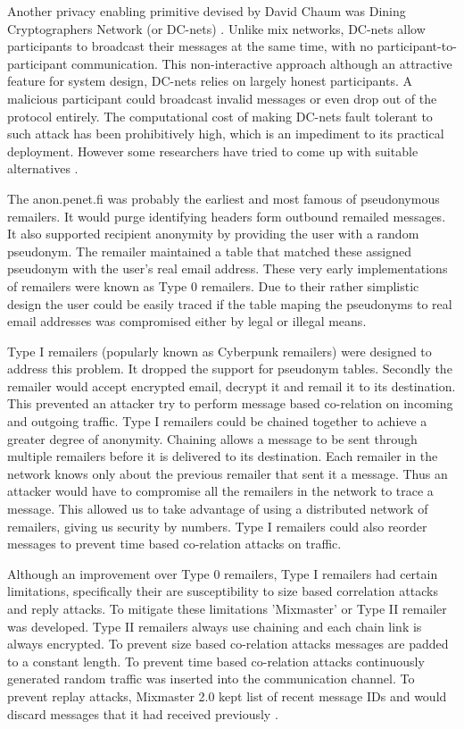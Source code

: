 \documentclass{llncs}
\begin{document}
Another privacy enabling primitive devised by David Chaum was Dining Cryptographers Network (or DC-nets) \cite{chaum-dc}. Unlike mix networks, DC-nets allow participants to broadcast their messages at the same time, with no participant-to-participant communication. This non-interactive approach although an attractive feature for system design, DC-nets relies on largely honest participants. A malicious participant could broadcast invalid messages or even drop out of the protocol entirely. The computational cost of making DC-nets fault tolerant to such attack has been prohibitively high, which is an impediment to its practical deployment. However some researchers have tried to come up with suitable alternatives \cite{golle:eurocrypt2004}.

The anon.penet.fi was probably the earliest and most famous of pseudonymous remailers. It would purge identifying headers form outbound remailed messages. It also supported recipient anonymity by providing the user with a random pseudonym. The remailer maintained a table that matched these assigned pseudonym with the user's real email address. These very early implementations of remailers were known as Type 0 remailers. Due to their rather simplistic design the user could be easily traced if the table maping the pseudonyms to real email addresses was compromised either by legal or illegal means.

Type I remailers (popularly known as Cyberpunk remailers) were designed to address this problem. It dropped the support for pseudonym tables. Secondly the remailer would accept encrypted email, decrypt it and remail it to its destination. This prevented an attacker try to perform message based co-relation on incoming and outgoing traffic. Type I remailers could be chained together to achieve a greater degree of anonymity. Chaining allows a message to be sent through multiple remailers before it is delivered to its destination. Each remailer in the network knows only about the previous remailer that sent it a message. Thus an attacker would have to compromise all the remailers in the network to trace a message. This allowed us to take advantage of using a distributed network of remailers, giving us security by numbers. Type I remailers could also reorder messages to prevent time based co-relation attacks on traffic.

Although an improvement over Type 0 remailers, Type I remailers had certain limitations, specifically their are susceptibility to size based correlation attacks and reply attacks. To mitigate these limitations 'Mixmaster' or Type II remailer was developed. Type II remailers always use chaining and each chain link is always encrypted. To prevent size based co-relation attacks messages are padded to a constant length. To prevent time based co-relation attacks continuously generated random traffic was inserted into the communication channel. To prevent replay attacks, Mixmaster 2.0 kept list of recent message IDs and would discard messages that it had received previously \cite{mixmaster-spec}.
\end{document}

